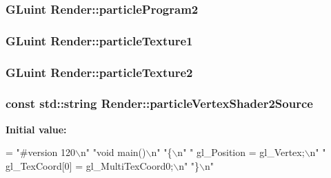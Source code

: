 \subsubsection[{particle\+Program2}]{\setlength{\rightskip}{0pt plus 5cm}G\+Luint Render\+::particle\+Program2\hspace{0.3cm}{\ttfamily [private]}}\label{classRender_ad8abc021db462a304ffbf43af03b8de6}
\hypertarget{classRender_a06b269a30c844daeae9af44ab9157dbe}{}
\subsubsection[{particle\+Texture1}]{\setlength{\rightskip}{0pt plus 5cm}G\+Luint Render\+::particle\+Texture1\hspace{0.3cm}{\ttfamily [private]}}\label{classRender_a06b269a30c844daeae9af44ab9157dbe}
\hypertarget{classRender_a2b70f4712c191f832e237e6481d537e8}{}
\subsubsection[{particle\+Texture2}]{\setlength{\rightskip}{0pt plus 5cm}G\+Luint Render\+::particle\+Texture2\hspace{0.3cm}{\ttfamily [private]}}\label{classRender_a2b70f4712c191f832e237e6481d537e8}
\hypertarget{classRender_a5f2e3ef7086c66483e5711d2b130042b}{}
\subsubsection[{particle\+Vertex\+Shader2\+Source}]{\setlength{\rightskip}{0pt plus 5cm}const std\+::string Render\+::particle\+Vertex\+Shader2\+Source\hspace{0.3cm}{\ttfamily [private]}}\label{classRender_a5f2e3ef7086c66483e5711d2b130042b}
{\bfseries Initial value\+:}
\begin{DoxyCode}
=
        \textcolor{stringliteral}{"#version 120\(\backslash\)n"}
        \textcolor{stringliteral}{"void main()\(\backslash\)n"}
        \textcolor{stringliteral}{"\{\(\backslash\)n"}
        \textcolor{stringliteral}{"   gl\_Position = gl\_Vertex;\(\backslash\)n"}
        \textcolor{stringliteral}{"   gl\_TexCoord[0] = gl\_MultiTexCoord0;\(\backslash\)n"}
        \textcolor{stringliteral}{"\}\(\backslash\)n"}
\end{DoxyCode}
\hypertarget{classRender_a71b1d6988fe8a9ab6c0c664216f327fe}{}
